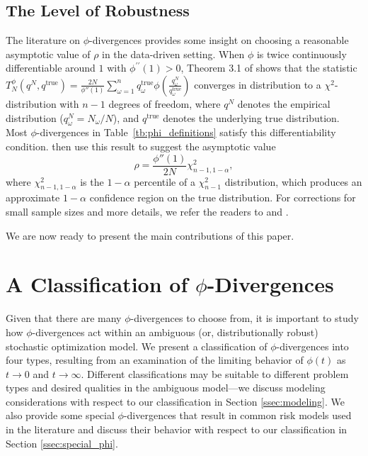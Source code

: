 \documentclass[opre,nonblindrev]{informs3} %
\newcommand{\qtrue}{q^{\text{true}}}
\begin{document}
\subsection{The Level of Robustness}
\label{ssec:robust_level}

The literature on $\phi$-divergences provides some insight on choosing a reasonable asymptotic value of $\rho$ in the data-driven setting. 
When $\phi$ is twice continuously differentiable around $1$ with $\phi^{\prime \prime}(1)>0$, Theorem 3.1 of \cite{pardo2005statistical} shows that the statistic $T^\phi_N(q^N,\qtrue) = \frac{2N}{\phi''(1)} \sum_{\omega=1}^n \qtrue_\omega \phi\left(\frac{q^N_\omega}{\qtrue_\omega}\right)$ converges in distribution to a $\chi^2$-distribution with $n-1$ degrees of freedom, where $q^N$ denotes the empirical distribution ($q^N_\omega = N_\omega/N$), and $\qtrue$ denotes the underlying true distribution.
Most $\phi$-divergences in Table~\ref{tb:phi_definitions} satisfy this differentiability condition.
\cite{bental2011robust} then use this result to suggest the asymptotic value
\begin{equation} \label{eq:asymptotic_rho}
	\rho = \frac{\phi''(1)}{2N} \chi^2_{n-1,1-\alpha},
\end{equation}
where $\chi^2_{n-1,1-\alpha}$ is the $1-\alpha$ percentile of a $\chi^2_{n-1}$ distribution, which produces an approximate $1-\alpha$ confidence region on the true distribution.
For corrections for small sample sizes and more details, we refer the readers to \citep{pardo2005statistical} and \citep{bental2011robust}. 

We are now ready to present the main contributions of this paper. 

\section{A Classification of $\phi$-Divergences}
\label{sec:classification}

Given that there are many $\phi$-divergences to choose from, it is important to study how $\phi$-divergences act within an ambiguous (or, distributionally robust) stochastic optimization model. 
We present a classification of $\phi$-divergences into four types, resulting from an examination of the limiting behavior of $\phi(t)$ as $t \rightarrow 0$ and $t \rightarrow \infty$.
Different classifications may be suitable to different problem types and desired qualities in the ambiguous model---we discuss modeling considerations with respect to our classification in Section \ref{ssec:modeling}.
We also provide some special $\phi$-divergences that result in common risk models used in the literature and discuss their behavior with respect to our classification in Section \ref{ssec:special_phi}.
\end{document}
